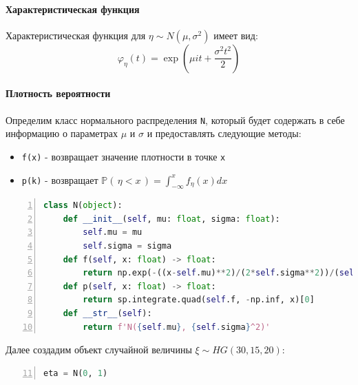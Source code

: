 \documentclass[
  russian,
  a4paper,
]{article}
\newcommand{\passthrough}[1]{#1}
\providecommand{\tightlist}{%
  \setlength{\itemsep}{0pt}\setlength{\parskip}{0pt}}
\let\oldparagraph\paragraph
\renewcommand{\paragraph}[1]{\oldparagraph{#1}\mbox{}}
\begin{document}
\hypertarget{ux445ux430ux440ux430ux43aux442ux435ux440ux438ux441ux442ux438ux447ux435ux441ux43aux430ux44f-ux444ux443ux43dux43aux446ux438ux44f-1}{%
\paragraph{Характеристическая
функция}\label{ux445ux430ux440ux430ux43aux442ux435ux440ux438ux441ux442ux438ux447ux435ux441ux43aux430ux44f-ux444ux443ux43dux43aux446ux438ux44f-1}}

Характеристическая функция для \(\eta \sim N(\mu, \sigma^2)\) имеет вид:
\[\varphi_\eta(t) = \exp\left(\mu it + \frac{\sigma^2 t^2}{2}\right)\]

\hypertarget{ux43fux43bux43eux442ux43dux43eux441ux442ux44c-ux432ux435ux440ux43eux44fux442ux43dux43eux441ux442ux438}{%
\paragraph{Плотность
вероятности}\label{ux43fux43bux43eux442ux43dux43eux441ux442ux44c-ux432ux435ux440ux43eux44fux442ux43dux43eux441ux442ux438}}

Определим класс нормального распределения \passthrough{\lstinline!N!},
который будет содержать в себе информацию о параметрах \(\mu\) и
\(\sigma\) и предоставлять следующие методы:

\begin{itemize}
\tightlist
\item
  \passthrough{\lstinline!f(x)!} - возвращает значение плотности в точке
  \passthrough{\lstinline!x!}
\item
  \passthrough{\lstinline!p(k)!} - возвращает
  \(\mathbb{P}\left(\, \eta < x \,\right) = \int_{-\infty}^x f_\eta(x)dx\)
\end{itemize}

\begin{lstlisting}[language=Python, numbers=left, firstnumber=1]
class N(object):
    def __init__(self, mu: float, sigma: float):
        self.mu = mu
        self.sigma = sigma
    def f(self, x: float) -> float:
        return np.exp(-((x-self.mu)**2)/(2*self.sigma**2))/(self.sigma*(2*np.pi)**.5)
    def p(self, x: float) -> float:
        return sp.integrate.quad(self.f, -np.inf, x)[0]
    def __str__(self):
        return f'N({self.mu}, {self.sigma}^2)'
\end{lstlisting}

Далее создадим объект случайной величины \(\xi \sim HG(30, 15, 20)\):

\begin{lstlisting}[language=Python, numbers=left, firstnumber=11]
eta = N(0, 1)
\end{lstlisting}
\end{document}
